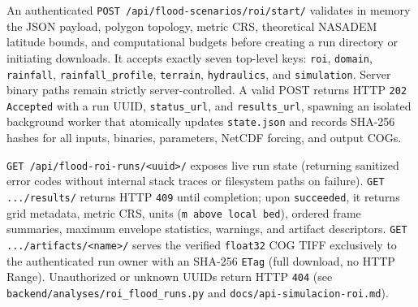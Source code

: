 \documentclass[11pt,a4paper]{article}
\newcommand{\src}[1]{\nolinkurl{#1}}
\begin{document}
\newpage
\noindent An authenticated \texttt{POST /api/flood-scenarios/roi/start/} validates in memory the JSON payload, polygon topology, metric CRS, theoretical NASADEM latitude bounds, and computational budgets before creating a run directory or initiating downloads. It accepts exactly seven top-level keys: \texttt{roi}, \texttt{domain}, \texttt{rainfall}, \texttt{rainfall\_profile}, \texttt{terrain}, \texttt{hydraulics}, and \texttt{simulation}. Server binary paths remain strictly server-controlled. A valid POST returns HTTP \texttt{202 Accepted} with a run UUID, \texttt{status\_url}, and \texttt{results\_url}, spawning an isolated background worker that atomically updates \texttt{state.json} and records SHA-256 hashes for all inputs, binaries, parameters, NetCDF forcing, and output COGs.

\begin{center}
\end{center}
\noindent\texttt{GET /api/flood-roi-runs/<uuid>/} exposes live run state (returning sanitized error codes without internal stack traces or filesystem paths on failure). \texttt{GET .../results/} returns HTTP \texttt{409} until completion; upon \texttt{succeeded}, it returns grid metadata, metric CRS, units (\texttt{m above local bed}), ordered frame summaries, maximum envelope statistics, warnings, and artifact descriptors. \texttt{GET .../artifacts/<name>/} serves the verified \texttt{float32} COG TIFF exclusively to the authenticated run owner with an SHA-256 \texttt{ETag} (full download, no HTTP Range). Unauthorized or unknown UUIDs return HTTP \texttt{404} (see \src{backend/analyses/roi_flood_runs.py} and \src{docs/api-simulacion-roi.md}).
\end{document}
